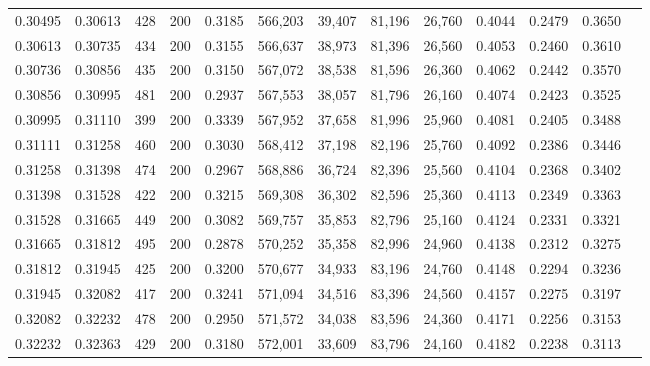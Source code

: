 \begin{tabular}{rrrrrrrrrrrrr}
0.30495 & 0.30613 &   428 & 200 &                                     0.3185 & 566,203 &  39,407 &  81,196 &  26,760 & 0.4044 & 0.2479 & 0.3650 \\
0.30613 & 0.30735 &   434 & 200 &                                     0.3155 & 566,637 &  38,973 &  81,396 &  26,560 & 0.4053 & 0.2460 & 0.3610 \\
0.30736 & 0.30856 &   435 & 200 &                                     0.3150 & 567,072 &  38,538 &  81,596 &  26,360 & 0.4062 & 0.2442 & 0.3570 \\
0.30856 & 0.30995 &   481 & 200 &                                     0.2937 & 567,553 &  38,057 &  81,796 &  26,160 & 0.4074 & 0.2423 & 0.3525 \\
0.30995 & 0.31110 &   399 & 200 &                                     0.3339 & 567,952 &  37,658 &  81,996 &  25,960 & 0.4081 & 0.2405 & 0.3488 \\
0.31111 & 0.31258 &   460 & 200 &                                     0.3030 & 568,412 &  37,198 &  82,196 &  25,760 & 0.4092 & 0.2386 & 0.3446 \\
0.31258 & 0.31398 &   474 & 200 &                                     0.2967 & 568,886 &  36,724 &  82,396 &  25,560 & 0.4104 & 0.2368 & 0.3402 \\
0.31398 & 0.31528 &   422 & 200 &                                     0.3215 & 569,308 &  36,302 &  82,596 &  25,360 & 0.4113 & 0.2349 & 0.3363 \\
0.31528 & 0.31665 &   449 & 200 &                                     0.3082 & 569,757 &  35,853 &  82,796 &  25,160 & 0.4124 & 0.2331 & 0.3321 \\
0.31665 & 0.31812 &   495 & 200 &                                     0.2878 & 570,252 &  35,358 &  82,996 &  24,960 & 0.4138 & 0.2312 & 0.3275 \\
0.31812 & 0.31945 &   425 & 200 &                                     0.3200 & 570,677 &  34,933 &  83,196 &  24,760 & 0.4148 & 0.2294 & 0.3236 \\
0.31945 & 0.32082 &   417 & 200 &                                     0.3241 & 571,094 &  34,516 &  83,396 &  24,560 & 0.4157 & 0.2275 & 0.3197 \\
0.32082 & 0.32232 &   478 & 200 &                                     0.2950 & 571,572 &  34,038 &  83,596 &  24,360 & 0.4171 & 0.2256 & 0.3153 \\
0.32232 & 0.32363 &   429 & 200 &                                     0.3180 & 572,001 &  33,609 &  83,796 &  24,160 & 0.4182 & 0.2238 & 0.3113 \\

\end{tabular}
